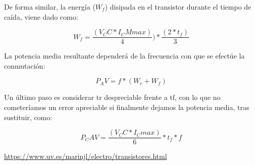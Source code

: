 \documentclass[11pt]{article}
\begin{document}
De forma similar, la energ\'ia ($W_f$) disipada en el transistor durante el tiempo de ca\'ida, viene dado como: 

 \begin{equation}
 W_f=\frac{(V_CC*I_CMmax)}{4})*\frac{(2*t_f)}{3}
\label{7}
 \end{equation}

La potencia media resultante depender\'a de la frecuencia con que se efect\'ue la conmutaci\'on:

\begin{equation}
 P_AV=f*(W_r+W_f)
\label{7}
 \end{equation}
 
 Un \'ultimo paso es considerar tr despreciable frente a tf, con lo que no cometer\'iamos un error apreciable si finalmente dejamos la potencia media, tras sustituir, como:

\begin{equation}
 P_CAV=\frac{(V_CC*I_Cmax)}{6}*t_f*f
\label{7}
 \end{equation}
 
\pagebreak
\begin{thebibliography}{0}
\textcolor{blue}{\url{https://www.uv.es/marinjl/electro/transistores.html}}\\



 \end{thebibliography}
\end{document}
